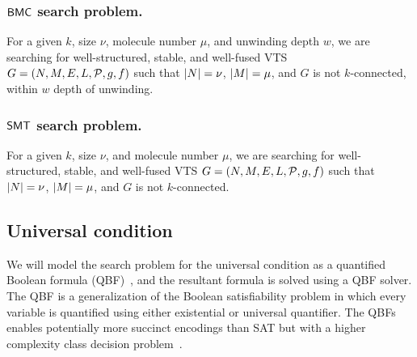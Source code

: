 \subsubsection{$\mathsf{BMC}$ search problem.}
For a given $k$, size $\nu$, molecule number $\mu$, and unwinding depth $w$,
we are searching for well-structured, stable, and well-fused VTS
$G = (N,M,E,L,\mathcal{P},g,f)$ such that
$|N| = \nu$, $|M| = \mu$, and $G$ is not $k$-connected, within $w$ depth of unwinding.    

\subsubsection{$\mathsf{SMT}$ search problem.}
For a given $k$, size $\nu$, and molecule number $\mu$,
we are searching for well-structured, stable, and well-fused VTS
$G = (N,M,E,L,\mathcal{P},g,f)$ such that
$|N| = \nu$, $|M| = \mu$, and
$G$ is not $k$-connected.    

%
%
%
%

\subsection{Universal condition}
\noindent We will model the search problem for the universal condition as a quantified Boolean formula (QBF)~\cite{buning2009theory, benedetti2008qbf}, and the resultant formula is solved using a QBF solver.
%
The QBF is a generalization of the Boolean satisfiability problem in which every variable is quantified using either existential or universal quantifier.
%
The QBFs enables potentially more succinct encodings than SAT but with a higher complexity class decision problem~\cite{savitch1970relationships, stockmeyer1973word}.
 
